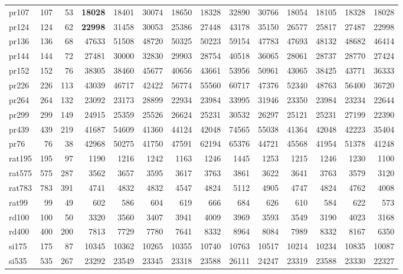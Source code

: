 {\begin{longtable}{l r r r r r r r r r r r r r}
pr107 & 107 & 53 & \textbf{18028} & 18401 & 30074 & 18650 & 18328 & 32890 & 30766 & 18054 & 18105 & 18328 & 18028 \\
pr124 & 124 & 62 & \textbf{22998} & 31458 & 30053 & 25386 & 27448 & 43178 & 35150 & 26577 & 25817 & 27487 & 22998 \\
pr136 & 136 & 68 & 47633 & 51508 & 48720 & 50325 & 50223 & 59154 & 47783 & 47693 & 48132 & 48682 & 46414 \\
pr144 & 144 & 72 & 27481 & 30000 & 32830 & 29903 & 28754 & 40518 & 36065 & 28061 & 28737 & 28770 & 27424 \\
pr152 & 152 & 76 & 38305 & 38460 & 45677 & 40656 & 43661 & 53956 & 50961 & 43065 & 38425 & 43771 & 36333 \\
pr226 & 226 & 113 & 43039 & 46717 & 42422 & 56774 & 55560 & 60717 & 47376 & 52340 & 48763 & 56400 & 36720 \\
pr264 & 264 & 132 & 23092 & 23173 & 28899 & 22934 & 23984 & 33995 & 31946 & 23350 & 23984 & 23234 & 22644 \\
pr299 & 299 & 149 & 24915 & 25359 & 25526 & 26624 & 25231 & 30532 & 26297 & 25121 & 25231 & 27199 & 22390 \\
pr439 & 439 & 219 & 41687 & 54609 & 41360 & 44124 & 42048 & 74565 & 55038 & 41364 & 42048 & 42223 & 35404 \\
pr76 & 76 & 38 & 42968 & 50275 & 41750 & 47591 & 62194 & 65376 & 44721 & 45568 & 41954 & 51378 & 41248 \\
rat195 & 195 & 97 & 1190 & 1216 & 1242 & 1163 & 1246 & 1445 & 1253 & 1215 & 1246 & 1230 & 1100 \\
rat575 & 575 & 287 & 3562 & 3657 & 3595 & 3617 & 3763 & 3861 & 3622 & 3641 & 3763 & 3579 & 3120 \\
rat783 & 783 & 391 & 4741 & 4832 & 4832 & 4547 & 4824 & 5112 & 4905 & 4747 & 4824 & 4762 & 4008 \\
rat99 & 99 & 49 & 602 & 586 & 604 & 619 & 666 & 684 & 626 & 610 & 584 & 622 & 573 \\
rd100 & 100 & 50 & 3320 & 3560 & 3407 & 3941 & 4009 & 3969 & 3593 & 3549 & 3190 & 4023 & 3168 \\
rd400 & 400 & 200 & 7813 & 7729 & 7780 & 7641 & 8332 & 8964 & 8084 & 7989 & 8332 & 8167 & 6350 \\
si175 & 175 & 87 & 10345 & 10362 & 10265 & 10355 & 10740 & 10763 & 10517 & 10214 & 10234 & 10835 & 10087 \\
si535 & 535 & 267 & 23292 & 23549 & 23345 & 23318 & 23588 & 26111 & 24247 & 23319 & 23588 & 23330 & 22327 \\

\end{longtable}}
